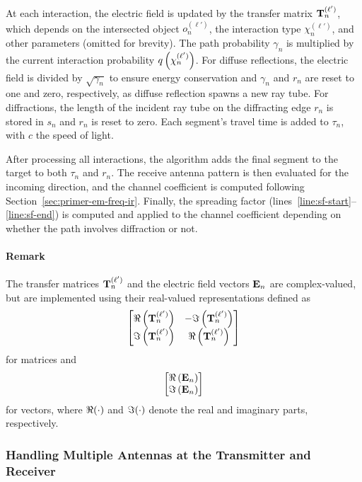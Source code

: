 At each interaction, the electric field is updated by the transfer matrix $\mathbf{T}_n^{(\ell')}$, which depends on the intersected object $o_n^{(\ell')}$, the interaction type $\chi_n^{(\ell')}$, and other parameters (omitted for brevity). The path probability $\gamma_n$ is multiplied by the current interaction probability $q\left( \chi_n^{(\ell')}\right)$.
For diffuse reflections, the electric field is divided by $\sqrt{\gamma_n}$ to ensure energy conservation and $\gamma_n$ and $r_n$ are reset to one and zero, respectively, as diffuse reflection spawns a new ray tube.
For diffractions, the length of the incident ray tube on the diffracting edge $r_n$ is stored in $s_n$ and $r_n$ is reset to zero.
Each segment’s travel time is added to $\tau_n$, with $c$ the speed of light.

After processing all interactions, the algorithm adds the final segment to the target to both $\tau_n$ and $r_n$.
The receive antenna pattern is then evaluated for the incoming direction, and the channel coefficient is computed following Section~\ref{sec:primer-em-freq-ir}.
Finally, the spreading factor (lines~\ref{line:sf-start}--\ref{line:sf-end}) is computed and applied to the channel coefficient depending on whether the path involves diffraction or not.

\paragraph{Remark}
The transfer matrices $\mathbf{T}_n^{(\ell')}$ and the electric field vectors $\mathbf{E}_n$ are complex-valued, but are implemented using their real-valued representations defined as
\begin{equation}
    \begin{bmatrix}
        \Re \left( \mathbf{T}_n^{(\ell')} \right) & -\Im \left( \mathbf{T}_n^{(\ell')} \right)\\
        \Im \left( \mathbf{T}_n^{(\ell')} \right) & \Re \left( \mathbf{T}_n^{(\ell')} \right)
    \end{bmatrix}
\end{equation}
for matrices and
\begin{equation}
    \begin{bmatrix}
        \Re\left( \mathbf{E}_n \right)\\
        \Im\left( \mathbf{E}_n \right)
    \end{bmatrix}
\end{equation}
for vectors, where $\Re{\left(\cdot \right)}$ and $\Im{\left(\cdot \right)}$ denote the real and imaginary parts, respectively.

\subsubsection{Handling Multiple Antennas at the Transmitter and Receiver}
\label{sec:path-solver-antenna-arrays}

